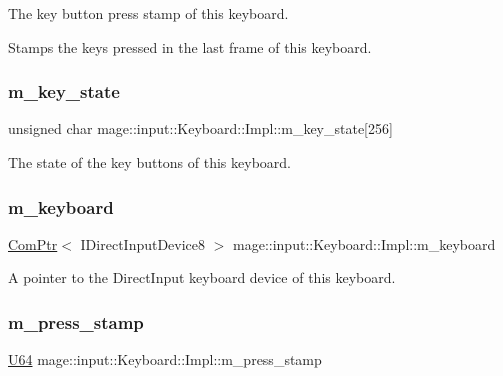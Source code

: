 The key button press stamp of this keyboard.

Stamps the keys pressed in the last frame of this keyboard. \hypertarget{classmage_1_1input_1_1_keyboard_1_1_impl_a0ac844ac40552bf68ddc12fabc7d3626}{}\label{classmage_1_1input_1_1_keyboard_1_1_impl_a0ac844ac40552bf68ddc12fabc7d3626} 
\subsubsection{\texorpdfstring{m\+\_\+key\+\_\+state}{m\_key\_state}}
{\footnotesize\ttfamily unsigned char mage\+::input\+::\+Keyboard\+::\+Impl\+::m\+\_\+key\+\_\+state\mbox{[}256\mbox{]}\hspace{0.3cm}{\ttfamily [private]}}

The state of the key buttons of this keyboard. \hypertarget{classmage_1_1input_1_1_keyboard_1_1_impl_a933e7f1f86e74c9f761018ef54fe5298}{}\label{classmage_1_1input_1_1_keyboard_1_1_impl_a933e7f1f86e74c9f761018ef54fe5298} 
\subsubsection{\texorpdfstring{m\+\_\+keyboard}{m\_keyboard}}
{\footnotesize\ttfamily \hyperlink{namespacemage_ae74f374780900893caa5555d1031fd79}{Com\+Ptr}$<$ I\+Direct\+Input\+Device8 $>$ mage\+::input\+::\+Keyboard\+::\+Impl\+::m\+\_\+keyboard\hspace{0.3cm}{\ttfamily [private]}}

A pointer to the Direct\+Input keyboard device of this keyboard. \hypertarget{classmage_1_1input_1_1_keyboard_1_1_impl_adfe57f2b8e59adae407850d66419bf5a}{}\label{classmage_1_1input_1_1_keyboard_1_1_impl_adfe57f2b8e59adae407850d66419bf5a} 
\subsubsection{\texorpdfstring{m\+\_\+press\+\_\+stamp}{m\_press\_stamp}}
{\footnotesize\ttfamily \hyperlink{namespacemage_a6672cf3c861707ce4a3235a3eb43941d}{U64} mage\+::input\+::\+Keyboard\+::\+Impl\+::m\+\_\+press\+\_\+stamp\hspace{0.3cm}{\ttfamily [private]}}

